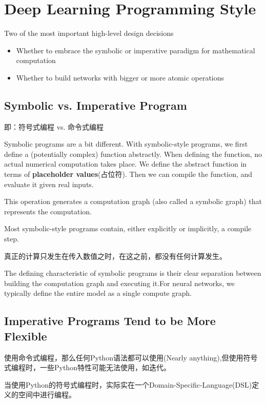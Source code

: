 \section{Deep Learning Programming Style}

Two of the most important high-level design decisions

\begin{itemize}
\item Whether to embrace the symbolic or imperative paradigm for mathematical computation

\item Whether to build networks with bigger or more atomic operations
\end{itemize}

\subsection{Symbolic vs. Imperative Program}

即：符号式编程 vs. 命令式编程

Symbolic programs are a bit different. With symbolic-style programs, we first define a (potentially complex) function abstractly. When defining the function, no actual numerical computation takes place. We define the abstract function in terms of \textbf{placeholder values}(占位符). Then we can compile the function, and evaluate it given real inputs. 

This operation generates a computation graph (also called a symbolic graph) that represents the computation.

Most symbolic-style programs contain, either explicitly or implicitly, a compile step. 

真正的计算只发生在传入数值之时，在这之前，都没有任何计算发生。

The defining characteristic of symbolic programs is their clear separation between building the computation graph and executing it.For neural networks, we typically define the entire model as a single compute graph.

\subsection{Imperative Programs Tend to be More Flexible}

使用命令式编程，那么任何Python语法都可以使用(Nearly anything),但使用符号式编程时，一些Python特性可能无法使用，如迭代。

当使用Python的符号式编程时，实际实在一个Domain-Specific-Language(DSL)定义的空间中进行编程。


